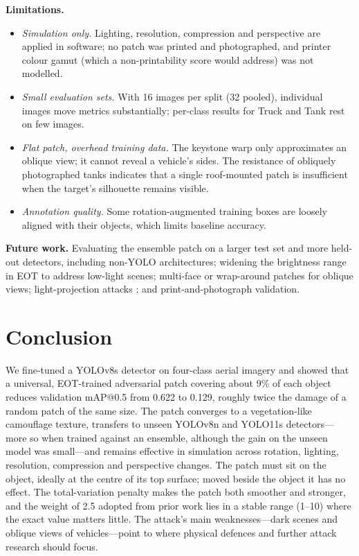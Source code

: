 \documentclass[conference]{IEEEtran}
\begin{document}
\textbf{Limitations.}
\begin{itemize}
\item \emph{Simulation only.} Lighting, resolution, compression and perspective are applied
in software; no patch was printed and photographed, and printer colour gamut (which a
non-printability score \cite{sharif2016accessorize} would address) was not modelled.
\item \emph{Small evaluation sets.} With 16 images per split (32 pooled), individual images
move metrics substantially; per-class results for Truck and Tank rest on few images.
\item \emph{Flat patch, overhead training data.} The keystone warp only approximates an
oblique view; it cannot reveal a vehicle's sides. The resistance of obliquely photographed
tanks indicates that a single roof-mounted patch is insufficient when the target's
silhouette remains visible.
\item \emph{Annotation quality.} Some rotation-augmented training boxes are loosely aligned
with their objects, which limits baseline accuracy.
\end{itemize}

\textbf{Future work.} Evaluating the ensemble patch on a larger test set and more held-out
detectors, including non-YOLO architectures; widening the brightness range in EOT to address
low-light scenes; multi-face or wrap-around patches for oblique views; light-projection
attacks \cite{gnanasambandam2021optical}; and print-and-photograph validation.

\section{Conclusion}
We fine-tuned a YOLOv8s detector on four-class aerial imagery and showed that a universal,
EOT-trained adversarial patch covering about 9\% of each object reduces validation mAP@0.5
from 0.622 to 0.129, roughly twice the damage of a random patch of the same size. The patch
converges to a vegetation-like camouflage texture, transfers to unseen YOLOv8n and YOLO11s
detectors---more so when trained against an ensemble, although the gain on the unseen model
was small---and remains effective in simulation across rotation, lighting, resolution,
compression and perspective changes. The patch must sit on the object, ideally at the centre
of its top surface; moved beside the object it has no effect. The total-variation
penalty makes the patch both smoother and stronger, and the weight of 2.5 adopted from prior
work lies in a stable range (1--10) where the exact value matters little. The attack's main
weaknesses---dark scenes and oblique views of vehicles---point to where physical defences and
further attack research should focus.
\end{document}
